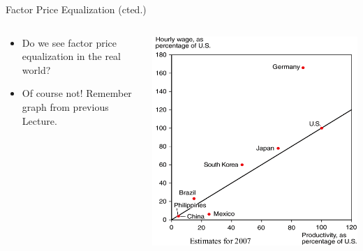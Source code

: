 \documentclass[10pt,hyperref={CJKbookmarks=true},xcolor=dvipsnames,aspectratio=169]{beamer}
\begin{document}
\begin{frame}{Factor Price Equalization (cted.) }


\begin{columns}[onlytextwidth]
\begin{column}{0.5\textwidth}
\begin{itemize}
\item Do we see factor price equalization in the real world? 
\item Of course not! Remember graph from previous Lecture.
\end{itemize}

\end{column}
\begin{column}{0.5\textwidth}
\includegraphics[width=0.9\columnwidth]{fig/ricardo/lec3-14}
\end{column}
\end{columns}

\end{frame}
\end{document}
